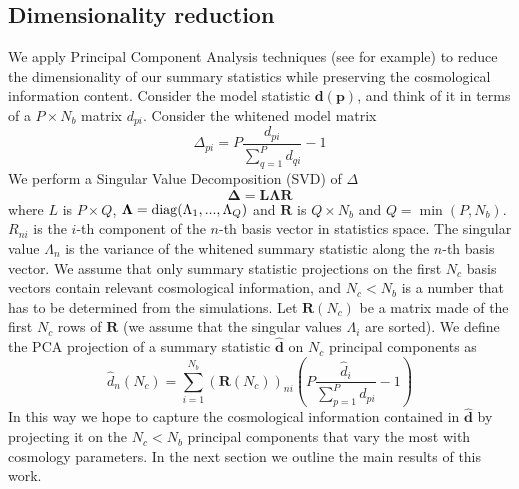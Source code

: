\documentclass[reprint,aps,prd,superscriptaddress,showkeys,showpacs]{revtex4-1}
\newcommand{\bb}[1]{\mathbf{#1}}
\newcommand{\bbh}[1]{\mathbf{\hat{#1}}}
\newcommand{\h}[1]{\hat{#1}}
\begin{document}
\subsection{Dimensionality reduction}
We apply Principal Component Analysis techniques (see \citep{astroMLText} for example) to reduce the dimensionality of our summary statistics while preserving the cosmological information content. Consider the model statistic $\bb{d}(\bb{p})$, and think of it in terms of a $P\times N_b$ matrix $d_{pi}$. Consider the whitened model matrix
\begin{equation}
\Delta_{pi} = P\frac{d_{pi}}{\sum_{q=1}^Pd_{qi}} - 1
\end{equation} 
%
We perform a Singular Value Decomposition (SVD) of $\Delta$ 
\begin{equation}
\bb\Delta = \bb{L}\bb{\Lambda} \bb{R}
\end{equation}
%
where $L$ is $P\times Q$, $\bb{\Lambda}={\rm diag}(\Lambda_1,...,\Lambda_Q)$ and $\bb{R}$ is $Q\times N_b$ and $Q={\min}(P,N_b)$. $R_{ni}$ is the $i$-th component of the $n$-th basis vector in statistics space. The singular value $\Lambda_n$ is the variance of the whitened summary statistic along the $n$-th basis vector. We assume that only summary statistic projections on the first $N_c$ basis vectors contain relevant cosmological information, and $N_c<N_b$ is a number that has to be determined from the simulations. Let $\bb{R}(N_c)$ be a matrix made of the first $N_c$ rows of $\bb{R}$ (we assume that the singular values $\Lambda_i$ are sorted). We define the PCA projection of a summary statistic $\bbh{d}$ on $N_c$ principal components as 
\begin{equation}
\label{meth:pcaprojection}
\h{d}_n(N_c) = \sum_{i=1}^{N_b}(\bb{R}(N_c))_{ni}\left(P\frac{\h{d}_i}{\sum_{p=1}^P d_{pi}}-1\right) 
\end{equation} 
%
In this way we hope to capture the cosmological information contained in $\bbh{d}$ by projecting it on the $N_c<N_b$ principal components that vary the most with cosmology parameters. In the next section we outline the main results of this work.  

\end{document}

